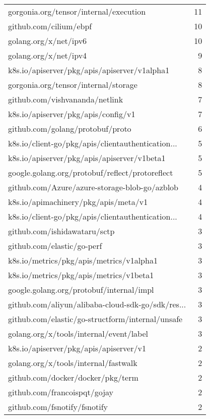 \begin{longtable}{lr}
    gorgonia.org/tensor/internal/execution &       11 \\
    github.com/cilium/ebpf &       10 \\
    golang.org/x/net/ipv6 &       10 \\
    golang.org/x/net/ipv4 &        9 \\
    k8s.io/apiserver/pkg/apis/apiserver/v1alpha1 &        8 \\
    gorgonia.org/tensor/internal/storage &        8 \\
    github.com/vishvananda/netlink &        7 \\
    k8s.io/apiserver/pkg/apis/config/v1 &        7 \\
    github.com/golang/protobuf/proto &        6 \\
    k8s.io/client-go/pkg/apis/clientauthentication... &        5 \\
    k8s.io/apiserver/pkg/apis/apiserver/v1beta1 &        5 \\
    google.golang.org/protobuf/reflect/protoreflect &        5 \\
    github.com/Azure/azure-storage-blob-go/azblob &        4 \\
    k8s.io/apimachinery/pkg/apis/meta/v1 &        4 \\
    k8s.io/client-go/pkg/apis/clientauthentication... &        4 \\
    github.com/ishidawataru/sctp &        3 \\
    github.com/elastic/go-perf &        3 \\
    k8s.io/metrics/pkg/apis/metrics/v1alpha1 &        3 \\
    k8s.io/metrics/pkg/apis/metrics/v1beta1 &        3 \\
    google.golang.org/protobuf/internal/impl &        3 \\
    github.com/aliyun/alibaba-cloud-sdk-go/sdk/res... &        3 \\
    github.com/elastic/go-structform/internal/unsafe &        3 \\
    golang.org/x/tools/internal/event/label &        3 \\
    k8s.io/apiserver/pkg/apis/apiserver/v1 &        2 \\
    golang.org/x/tools/internal/fastwalk &        2 \\
    github.com/docker/docker/pkg/term &        2 \\
    github.com/francoispqt/gojay &        2 \\
    github.com/fsnotify/fsnotify &        2 \\

\end{longtable}
